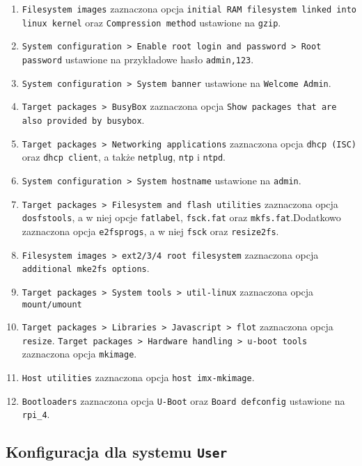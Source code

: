 \documentclass{article}
\begin{document}
\begin{enumerate}[label=\arabic*.]
    \item \texttt{Filesystem images} zaznaczona opcja \texttt{initial RAM filesystem linked into linux kernel} oraz \texttt{Compression method} ustawione na \texttt{gzip}.
    \item \texttt{System configuration > Enable root login and password > Root password} ustawione na przykładowe hasło \texttt{admin,123}.
    \item \texttt{System configuration > System banner} ustawione na \texttt{Welcome Admin}.
    \item \texttt{Target packages > BusyBox} zaznaczona opcja \texttt{Show packages that are also provided by busybox}.
    \item \texttt{Target packages > Networking applications} zaznaczona opcja \texttt{dhcp (ISC)} oraz \texttt{dhcp client}, a także \texttt{netplug}, \texttt{ntp} i \texttt{ntpd}.
    \item \texttt{System configuration > System hostname} ustawione na \texttt{admin}.
    \item \texttt{Target packages > Filesystem and flash utilities} zaznaczona opcja \texttt{dosfstools}, a w niej opcje \texttt{fatlabel}, \texttt{fsck.fat} oraz \texttt{mkfs.fat}.Dodatkowo zaznaczona opcja \texttt{e2fsprogs}, a w niej \texttt{fsck} oraz \texttt{resize2fs}.
    \item \texttt{Filesystem images > ext2/3/4 root filesystem} zaznaczona opcja \texttt{additional mke2fs options}.
    \item \texttt{Target packages > System tools > util-linux} zaznaczona opcja \texttt{mount/umount}
    \item \texttt{Target packages > Libraries > Javascript > flot} zaznaczona opcja \texttt{resize}.
    \texttt{Target packages > Hardware handling > u-boot tools} zaznaczona opcja \texttt{mkimage}.
    \item \texttt{Host utilities} zaznaczona opcja \texttt{host imx-mkimage}.
    \item \texttt{Bootloaders} zaznaczona opcja \texttt{U-Boot} oraz \texttt{Board defconfig} ustawione na \texttt{rpi\_4}.
\end{enumerate}

\subsection{Konfiguracja dla systemu \texttt{User}}
\end{document}
